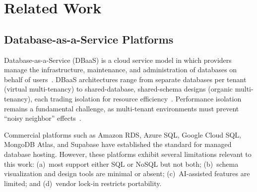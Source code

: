 \documentclass[twoside,twocolumn,10pt]{article}
\begin{document}
\section{Related Work}
\fontsize{11}{13}\selectfont

\subsection{Database-as-a-Service Platforms}

Database-as-a-Service (DBaaS) is a cloud service model in which providers manage the infrastructure, maintenance, and administration of databases on behalf of users~\cite{Database_as_a_service}. DBaaS architectures range from separate databases per tenant (virtual multi-tenancy) to shared-database, shared-schema designs (organic multi-tenancy), each trading isolation for resource efficiency~\cite{Comparison_of_dbaas_architectures}. Performance isolation remains a fundamental challenge, as multi-tenant environments must prevent ``noisy neighbor'' effects~\cite{Performance_Isolation_DBaaS, Solver_in_the_loop}.

Commercial platforms such as Amazon RDS, Azure SQL, Google Cloud SQL, MongoDB Atlas, and Supabase have established the standard for managed database hosting. However, these platforms exhibit several limitations relevant to this work: (a)~most support either SQL or NoSQL but not both; (b)~schema visualization and design tools are minimal or absent; (c)~AI-assisted features are limited; and (d)~vendor lock-in restricts portability.
\end{document}
